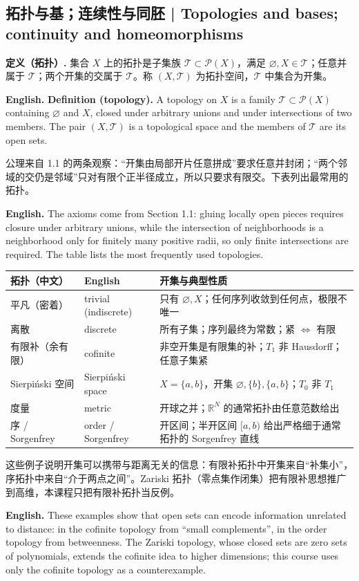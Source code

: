 \documentclass[UTF8,11pt,a4paper]{ctexart}
\newcommand{\EN}[1]{\par\noindent\textbf{English.} #1\par}
\begin{document}
\subsection{拓扑与基；连续性与同胚 | Topologies and bases; continuity and homeomorphisms}
\noindent\textbf{定义（拓扑）.} 集合 $X$ 上的拓扑是子集族 $\mathcal T\subset\mathcal P(X)$，满足 $\varnothing,X\in\mathcal T$；任意并属于 $\mathcal T$；两个开集的交属于 $\mathcal T$。称 $(X,\mathcal T)$ 为拓扑空间，$\mathcal T$ 中集合为开集。
\EN{\textbf{Definition (topology).} A topology on $X$ is a family $\mathcal T\subset\mathcal P(X)$ containing $\varnothing$ and $X$, closed under arbitrary unions and under intersections of two members. The pair $(X,\mathcal T)$ is a topological space and the members of $\mathcal T$ are its open sets.}

\noindent 公理来自 1.1 的两条观察：“开集由局部开片任意拼成”要求任意并封闭；“两个邻域的交仍是邻域”只对有限个正半径成立，所以只要求有限交。下表列出最常用的拓扑。
\EN{The axioms come from Section 1.1: gluing locally open pieces requires closure under arbitrary unions, while the intersection of neighborhoods is a neighborhood only for finitely many positive radii, so only finite intersections are required. The table lists the most frequently used topologies.}

{\small
\begin{center}
\begin{tabular}{llp{7.2cm}}
\toprule
拓扑（中文） & English & 开集与典型性质\\
\midrule
平凡（密着） & trivial (indiscrete) & 只有 $\varnothing,X$；任何序列收敛到任何点，极限不唯一\\
离散 & discrete & 所有子集；序列最终为常数；紧 $\iff$ 有限\\
有限补（余有限） & cofinite & 非空开集是有限集的补；$T_1$ 非 Hausdorff；任意子集紧\\
Sierpi\'nski 空间 & Sierpi\'nski space & $X=\{a,b\}$，开集 $\varnothing,\{b\},\{a,b\}$；$T_0$ 非 $T_1$\\
度量 & metric & 开球之并；$\mathbb R^N$ 的通常拓扑由任意范数给出\\
序 / Sorgenfrey & order / Sorgenfrey & 开区间；半开区间 $[a,b)$ 给出严格细于通常拓扑的 Sorgenfrey 直线\\
\bottomrule
\end{tabular}
\end{center}
}

\noindent 这些例子说明开集可以携带与距离无关的信息：有限补拓扑中开集来自“补集小”，序拓扑中来自“介于两点之间”。Zariski 拓扑（零点集作闭集）把有限补思想推广到高维，本课程只把有限补拓扑当反例。
\EN{These examples show that open sets can encode information unrelated to distance: in the cofinite topology from ``small complements'', in the order topology from betweenness. The Zariski topology, whose closed sets are zero sets of polynomials, extends the cofinite idea to higher dimensions; this course uses only the cofinite topology as a counterexample.}
\end{document}
